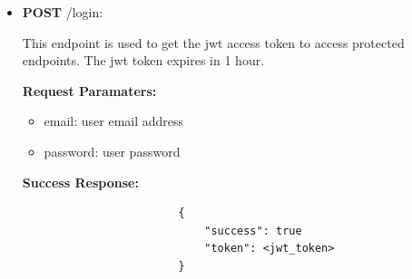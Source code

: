 \documentclass{article}
\begin{document}
\begin{itemize}
             \item \textbf{POST} /login:
                \begin{addmargin}[1em]{2em}%
                    This endpoint is used to get the jwt access token to access protected endpoints. The jwt token expires in 1 hour.
                    \par\textbf{Request Paramaters:}
                    \begin{itemize}
                        \item email: user email address
                        \item password: user password
                    \end{itemize}
                    \par\textbf{Success Response:}
                    \begin{listing}[H]
                    \begin{verbatim}
                        {     
                            "success": true
                            "token": <jwt_token>
                        }
                    \end{verbatim}
                    \end{listing}
                \end{addmargin}


\end{itemize}
\end{document}
